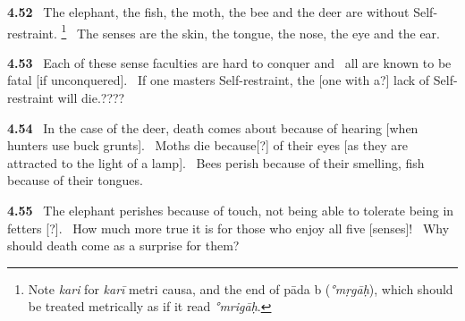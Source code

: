 \documentclass{article}
\newcommand{\skt}[1]{\textit{#1}}
\begin{document}
\textbf{4.52}%
\ The elephant, the fish, the moth, the bee and the deer are without Self-restraint.%
\footnote{Note \skt{kari} for \skt{karī} metri causa, and the end of pāda b (\skt{°mṛgāḥ}), which                         should be treated metrically as if it read \skt{°mrigāḥ}. }%
\ The senses are the skin, the tongue, the nose, the eye and the ear.%


\textbf{4.53}%
\ Each of these sense faculties are hard to conquer and%
\                         all are known to be fatal [if unconquered].%
\ If one masters Self-restraint, the [one with a?] lack of Self-restraint will die.????%


\textbf{4.54}%
\ In the case of the deer, death comes about because of hearing [when hunters use buck grunts].%
\                  Moths die because[?] of their eyes [as they are attracted to the light of a lamp].%
\ Bees perish because of their smelling, fish because of their tongues.%


\textbf{4.55}%
\ The elephant perishes because of touch, not being able to tolerate being in fetters [?].%
\ How much more true it is for those who enjoy all five [senses]!%
\                  Why should death come as a surprise for them?%
\end{document}
